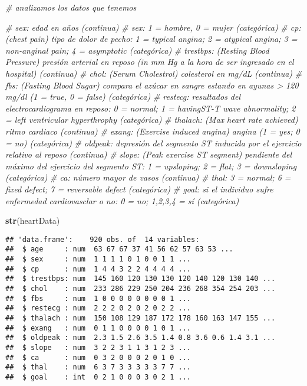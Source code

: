 \documentclass[
]{article}
\newenvironment{Shaded}{\begin{snugshade}}{\end{snugshade}}
\newcommand{\CommentTok}[1]{\textcolor[rgb]{0.56,0.35,0.01}{\textit{#1}}}
\newcommand{\KeywordTok}[1]{\textcolor[rgb]{0.13,0.29,0.53}{\textbf{#1}}}
\newcommand{\NormalTok}[1]{#1}
\begin{document}
\begin{Shaded}
\begin{Highlighting}[]
\CommentTok{# analizamos los datos que tenemos}

\CommentTok{# sex: edad en años (continua)}
\CommentTok{# sex: 1 = hombre, 0 = mujer (categórica)}
\CommentTok{# cp: (chest pain) tipo de dolor de pecho: 1 = typical angina; 2 = atypical angina; 3 = non-anginal pain; 4 = asymptotic (categórica)}
\CommentTok{# trestbps: (Resting Blood Pressure) presión arterial en reposo (in mm Hg a la hora de ser ingresado en el hospital) (continua)}
\CommentTok{# chol: (Serum Cholestrol) colesterol en mg/dL (continua)}
\CommentTok{# fbs: (Fasting Blood Sugar) compara el azúcar en sangre estando en ayunas > 120 mg/dl (1 = true, 0 = false) (categórica)}
\CommentTok{# restecg: resultados del electrocardiograma en reposo: 0 = normal; 1 = havingST-T wave abnormality; 2 = left ventricular hyperthrophy (categórica)}
\CommentTok{# thalach: (Max heart rate achieved) ritmo cardiaco (continua)}
\CommentTok{# exang: (Exercise induced angina) angina (1 = yes; 0 = no) (categórica)}
\CommentTok{# oldpeak: depresión del segmento ST inducida por el ejercicio relativo al reposo (continua)}
\CommentTok{# slope: (Peak exercise ST segment) pendiente del máximo del ejercicio del segmento ST: 1 = upsloping; 2 = flat; 3 = downsloping (categórica)}
\CommentTok{# ca: número mayor de vasos (continua)}
\CommentTok{# thal: 3 = normal; 6 = fixed defect; 7 = reversable defect (categórica)}
\CommentTok{# goal: si el individuo sufre enfermedad cardiovasclar o no: 0 = no; 1,2,3,4 = sí (categórica)}

\KeywordTok{str}\NormalTok{(heartData)}
\end{Highlighting}
\end{Shaded}

\begin{verbatim}
## 'data.frame':    920 obs. of  14 variables:
##  $ age     : num  63 67 67 37 41 56 62 57 63 53 ...
##  $ sex     : num  1 1 1 1 0 1 0 0 1 1 ...
##  $ cp      : num  1 4 4 3 2 2 4 4 4 4 ...
##  $ trestbps: num  145 160 120 130 130 120 140 120 130 140 ...
##  $ chol    : num  233 286 229 250 204 236 268 354 254 203 ...
##  $ fbs     : num  1 0 0 0 0 0 0 0 0 1 ...
##  $ restecg : num  2 2 2 0 2 0 2 0 2 2 ...
##  $ thalach : num  150 108 129 187 172 178 160 163 147 155 ...
##  $ exang   : num  0 1 1 0 0 0 0 1 0 1 ...
##  $ oldpeak : num  2.3 1.5 2.6 3.5 1.4 0.8 3.6 0.6 1.4 3.1 ...
##  $ slope   : num  3 2 2 3 1 1 3 1 2 3 ...
##  $ ca      : num  0 3 2 0 0 0 2 0 1 0 ...
##  $ thal    : num  6 3 7 3 3 3 3 3 7 7 ...
##  $ goal    : int  0 2 1 0 0 0 3 0 2 1 ...
\end{verbatim}
\end{document}
